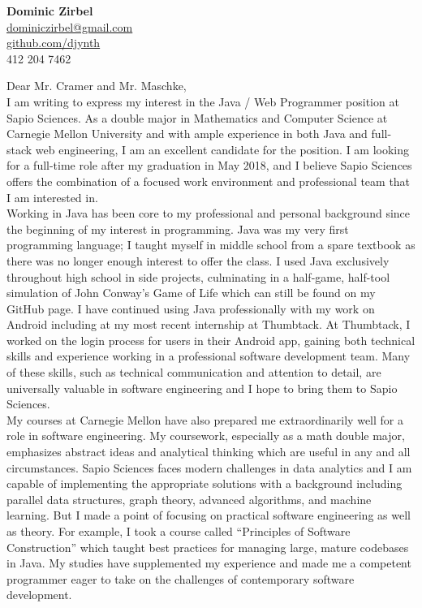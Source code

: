 \documentclass[letterpaper,10pt]{article}
\newcommand{\lb}{\vspace{14pt} \\}
\begin{document}
\thispagestyle{empty}

\begin{flushright}
    \textbf{\Large{Dominic Zirbel}} \\
    \href{mailto:dominiczirbel@gmail.com}{dominiczirbel@gmail.com} \\
    \href{https://github.com/djynth}{github.com/djynth} \\
    412 204 7462
\end{flushright}

\vspace{36pt}

Dear Mr. Cramer and Mr. Maschke,
\lb
I am writing to express my interest in the Java / Web Programmer position at Sapio Sciences. As a double major in Mathematics and Computer Science at Carnegie Mellon University and with ample experience in both Java and full-stack web engineering, I am an excellent candidate for the position. I am looking for a full-time role after my graduation in May 2018, and I believe Sapio Sciences offers the combination of a focused work environment and professional team that I am interested in.
\lb
Working in Java has been core to my professional and personal background since the beginning of my interest in programming. Java was my very first programming language; I taught myself in middle school from a spare textbook as there was no longer enough interest to offer the class. I used Java exclusively throughout high school in side projects, culminating in a half-game, half-tool simulation of John Conway's Game of Life which can still be found on my GitHub page. I have continued using Java professionally with my work on Android including at my most recent internship at Thumbtack. At Thumbtack, I worked on the login process for users in their Android app, gaining both technical skills and experience working in a professional software development team. Many of these skills, such as technical communication and attention to detail, are universally valuable in software engineering and I hope to bring them to Sapio Sciences.
\lb
My courses at Carnegie Mellon have also prepared me extraordinarily well for a role in software engineering. My coursework, especially as a math double major, emphasizes abstract ideas and analytical thinking which are useful in any and all circumstances. Sapio Sciences faces modern challenges in data analytics and I am capable of implementing the appropriate solutions with a background including parallel data structures, graph theory, advanced algorithms, and machine learning. But I made a point of focusing on practical software engineering as well as theory. For example, I took a course called ``Principles of Software Construction'' which taught best practices for managing large, mature codebases in Java. My studies have supplemented my experience and made me a competent programmer eager to take on the challenges of contemporary software development.
\end{document}
